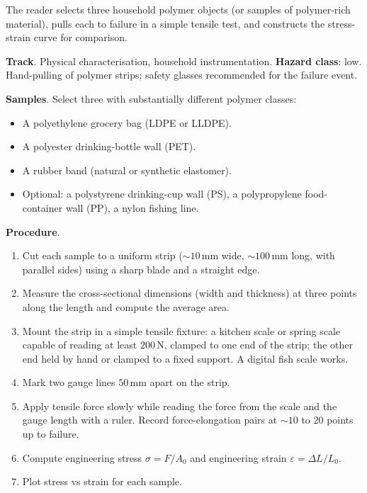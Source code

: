 \begin{project}
The reader selects three household polymer objects (or samples of
polymer-rich material), pulls each to failure in a simple tensile
test, and constructs the stress-strain curve for comparison.

\textbf{Track}. Physical characterisation, household instrumentation.
\textbf{Hazard class}: low. Hand-pulling of polymer strips; safety
glasses recommended for the failure event.

\textbf{Samples}. Select three with substantially different polymer
classes:

\begin{itemize}[leftmargin=*]
\item A polyethylene grocery bag (LDPE or LLDPE).
\item A polyester drinking-bottle wall (PET).
\item A rubber band (natural or synthetic elastomer).
\item Optional: a polystyrene drinking-cup wall (PS), a polypropylene
  food-container wall (PP), a nylon fishing line.
\end{itemize}

\textbf{Procedure}.

\begin{enumerate}[leftmargin=*]
\item Cut each sample to a uniform strip ($\sim 10\,\text{mm}$ wide,
  $\sim 100\,\text{mm}$ long, with parallel sides) using a sharp
  blade and a straight edge.
\item Measure the cross-sectional dimensions (width and thickness) at
  three points along the length and compute the average area.
\item Mount the strip in a simple tensile fixture: a kitchen scale or
  spring scale capable of reading at least $200\,\text{N}$, clamped
  to one end of the strip; the other end held by hand or clamped to
  a fixed support. A digital fish scale works.
\item Mark two gauge lines $50\,\text{mm}$ apart on the strip.
\item Apply tensile force slowly while reading the force from the
  scale and the gauge length with a ruler. Record force-elongation
  pairs at $\sim 10$ to $20$ points up to failure.
\item Compute engineering stress $\sigma = F/A_0$ and engineering
  strain $\varepsilon = \Delta L/L_0$.
\item Plot stress vs strain for each sample.
\end{enumerate}


\end{project}
